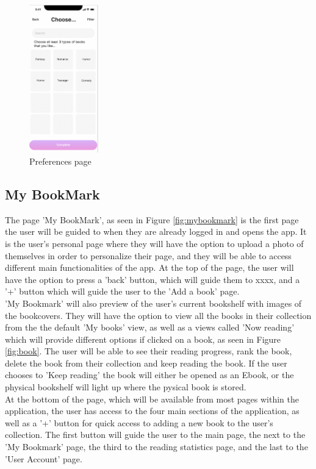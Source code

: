 \documentclass[conference]{IEEEtran}
\begin{document}
\begin{figure}[h]
    \centering
    \includegraphics[width=3cm]{Ressources/Specifications/categories.png}
    \caption{Preferences page}
    \label{fig:categories}
\end{figure}



\subsection{My BookMark}
The page 'My BookMark', as seen in Figure \ref{fig:mybookmark} is the first page the user will be guided to when they are already logged in and opens the app. It is the user's personal page where they will have the option to upload a photo of themselves in order to personalize their page, and they will be able to access different main functionalities of the app. At the top of the page, the user will have the option to press a 'back' button, which will guide them to xxxx, and a '+' button which will guide the user to the 'Add a book' page. \\

'My Bookmark' will also preview of the user's current bookshelf with images of the bookcovers. They will have the option to view all the books in their collection from the the default 'My books' view, as well as a views called 'Now reading' which will provide different options if clicked on a book, as seen in Figure \ref{fig:book}. The user will be able to see their reading progress, rank the book, delete the book from their collection and keep reading the book. If the user chooses to 'Keep reading' the book will either be opened as an Ebook, or the physical bookshelf will light up where the pysical book is stored.  \\

At the bottom of the page, which will be available from most pages within the application, the user has access to the four main sections of the application, as well as a '+' button for quick access to adding a new book to the user's collection. The first button will guide the user to the main page, the next to the 'My Bookmark' page, the third to the reading statistics page, and the last to the 'User Account' page.
\end{document}
